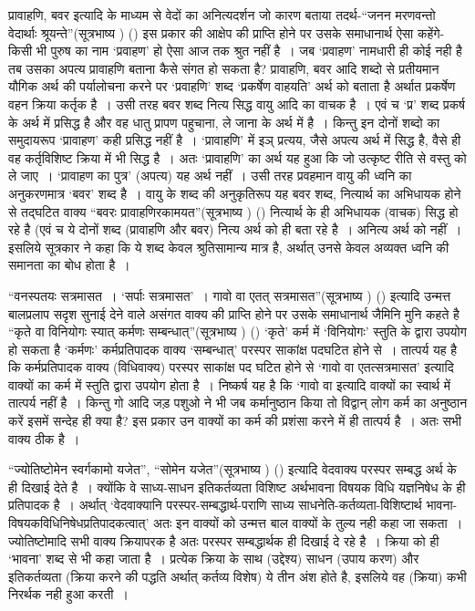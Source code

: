 प्रावाहणि, बवर इत्यादि के माध्यम से वेदों का अनित्यदर्शन जो कारण बताया तदर्थ-“जनन मरणवन्तो वेदार्थाः श्रूयन्ते”(सूत्रभाष्य ) () इस प्रकार की आक्षेप की प्राप्ति होने पर उसके समाधानार्थ ऐसा कहेंगे- किसी भी पुरुष का नाम ‘प्रवाहण' हो ऐसा आज तक श्रुत नहीं है~। जब ‘प्रवाहण' नामधारी ही कोई नही है तब उसका अपत्य प्रावाहणि बताना कैसे संगत हो सकता है? प्रावाहणि, बवर आदि शब्दो से प्रतीयमान यौगिक अर्थ की पर्यालोचना करने पर ‘प्रवाहणि' शब्द ‘प्रकर्षेण वाहयति' अर्थ को बताता है अर्थात प्रकर्षेण वहन क्रिया कर्तृक है~। उसी तरह बवर शब्द नित्य सिद्ध वायु आदि का वाचक है~। एवं च ‘प्र' शब्द प्रकर्ष के अर्थ में प्रसिद्ध है और वह धातु प्रापण पहुचाना, ले जाना के अर्थ में है~। किन्तु इन दोनों शब्दो का समुदायरूप ‘प्रावाहण' कही प्रसिद्ध नहीं है~। ‘प्रावाहणि' में इञ् प्रत्यय, जैसे अपत्य अर्थ में सिद्ध है, वैसे ही वह कर्तृविशिष्ट क्रिया में भी सिद्ध है~। अतः ‘प्रावाहणि' का अर्थ यह हुआ कि जो उत्कृष्ट रीति से वस्तु को ले जाए~। ‘प्रावाहण का पुत्र' (अपत्य) यह अर्थ नहीं~। उसी तरह प्रवहमान वायु की ध्वनि का अनुकरणमात्र ‘बवर' शब्द है~। वायु के शब्द की अनुकृतिरूप यह बवर शब्द, नित्यार्थ का अभिधायक होने से तद्घटित वाक्य “बवरः प्रावाहणिरकामयत”(सूत्रभाष्य ) () नित्यार्थ के ही अभिधायक (वाचक) सिद्ध हो रहे है (एवं च ये दोनों शब्द (प्रावाहणि और बवर) नित्य अर्थ को ही बता रहे है~। अनित्य अर्थ को नहीं~। इसलिये सूत्रकार ने कहा कि ये शब्द केवल श्रुतिसामान्य मात्र है, अर्थात् उनसे केवल अव्यक्त ध्वनि की समानता का बोध होता है~।

“वनस्पतयः सत्रमासत~। ‘सर्पाः सत्रमासत'~। गावो वा एतत् सत्रमासत”(सूत्रभाष्य ) () इत्यादि उन्मत्त बालप्रलाप सदृश सुनाई देने वाले असंगत वाक्य की प्राप्ति होने पर उसके समाधानार्थ जैमिनि मुनि कहते है “कृते वा विनियोगः स्यात् कर्मणः सम्बन्धात्”(सूत्रभाष्य ) () ‘कृते' कर्म में ‘विनियोगः' स्तुति के द्वारा उपयोग हो सकता है ‘कर्मणः' कर्मप्रतिपादक वाक्य ‘सम्बन्धात्' परस्पर साकांक्ष पदघटित होने से~। तात्पर्य यह है कि कर्मप्रतिपादक वाक्य (विधिवाक्य) परस्पर साकांक्ष पद घटित होने से ‘गावो वा एतत्सत्रमासत' इत्यादि वाक्यों का कर्म में स्तुति द्वारा उपयोग होता है~। निष्कर्ष यह है कि ‘गावो वा इत्यादि वाक्यों का स्वार्थ में तात्पर्य नहीं है~। किन्तु गो आदि जड़ पशुओ ने भी जब कर्मानुष्ठान किया तो विद्वान् लोग कर्म का अनुष्ठान करें इसमें सन्देह ही क्या है? इस प्रकार उन वाक्यों का कर्म की प्रशंसा करने में ही तात्पर्य है~। अतः सभी वाक्य ठीक है~।

“ज्योतिष्टोमेन स्वर्गकामो यजेत”, “सोमेन यजेत”(सूत्रभाष्य ) () इत्यादि वेदवाक्य परस्पर सम्बद्ध अर्थ के ही दिखाई देते है~। क्योंकि वे साध्य-साधन इतिकर्तव्यता विशिष्ट अर्थभावना विषयक विधि यज्ञनिषेध के ही प्रतिपादक है~। अर्थात् ‘वेदवाक्यानि परस्पर-सम्बद्धार्थ-पराणि साध्य साधनेति-कर्तव्यता-विशिष्टार्थ भावना-विषयकविधिनिषेधप्रतिपादकत्वात्' अतः इन वाक्यों को उन्मत्त बाल वाक्यों के तुल्य नही कहा जा सकता~। ज्योतिष्टोमादि सभी वाक्य क्रियापरक है अतः परस्पर सम्बद्धार्थक ही दिखाई दे रहे है~। क्रिया को ही ‘भावना' शब्द से भी कहा जाता है~। प्रत्येक क्रिया के साथ (उद्देश्य) साधन (उपाय करण) और इतिकर्तव्यता (क्रिया करने की पद्धति अर्थात् कर्तव्य विशेष) ये तीन अंश होते है, इसलिये वह (क्रिया) कभी निरर्थक नही हुआ करती~।

